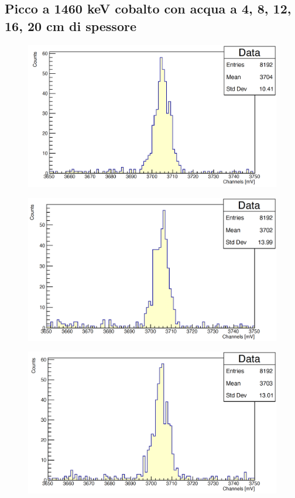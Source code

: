 \documentclass[a4paper,10pt]{article}
\begin{document}
\subsection{Picco a 1460 keV cobalto con acqua a 4, 8, 12, 16, 20 cm di spessore}
\begin{figure}[H]
    \centering
    \includegraphics[scale=0.45]{appendice/spettri/CoA_1460_4}
\end{figure}
\begin{figure}[H]
    \centering
    \includegraphics[scale=0.45]{appendice/spettri/CoA_1460_8}
\end{figure}
\begin{figure}[H]
    \centering
    \includegraphics[scale=0.45]{appendice/spettri/CoA_1460_12}
\end{figure}
\end{document}
